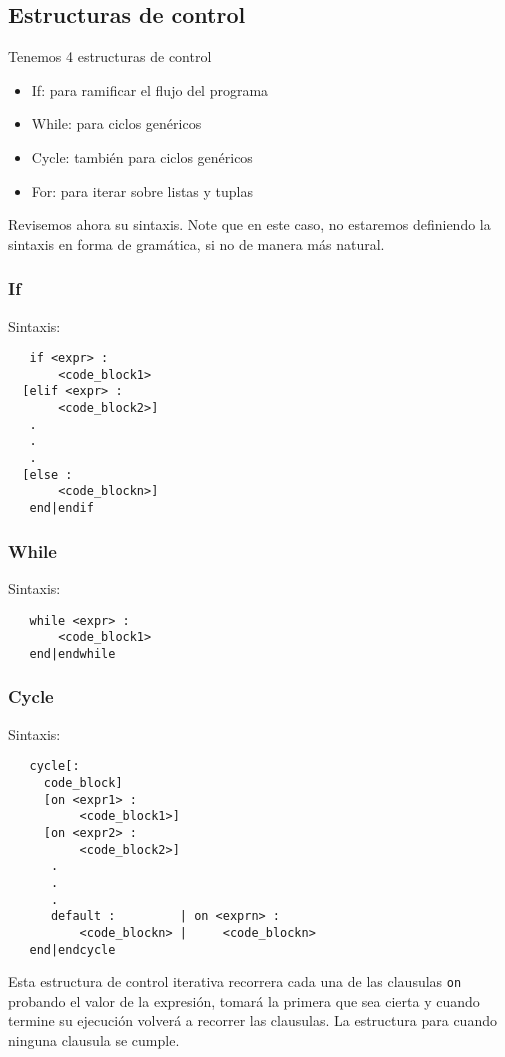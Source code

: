 \documentclass[12pt, spanish]{report}
\begin{document}
\subsection{Estructuras de control}
\label{sec:ecntrl}
Tenemos 4 estructuras de control
\begin{itemize}
\item If: para ramificar el flujo del programa
\item While: para ciclos gen\'ericos
\item Cycle: tambi\'en para ciclos gen\'ericos
\item For: para iterar sobre listas y tuplas
\end{itemize}

Revisemos ahora su sintaxis. Note que en este caso, no estaremos
definiendo la sintaxis en forma de gram\'atica, si no de manera m\'as natural.

\subsubsection{If}
Sintaxis:
\begin{verbatim}
   if <expr> :
       <code_block1>
  [elif <expr> :
       <code_block2>]
   .
   .
   .
  [else :
       <code_blockn>]
   end|endif
\end{verbatim}

\subsubsection{While}
Sintaxis:
\begin{verbatim}
   while <expr> :
       <code_block1>
   end|endwhile
\end{verbatim}

\subsubsection{Cycle}
Sintaxis:
\begin{verbatim}
   cycle[:
     code_block]
     [on <expr1> :
          <code_block1>]
     [on <expr2> :
          <code_block2>]
      .
      .
      .
      default :         | on <exprn> :
          <code_blockn> |     <code_blockn>
   end|endcycle
\end{verbatim}
Esta estructura de control iterativa recorrera cada una de las clausulas
\texttt{on} probando el valor de la expresi\'on, tomar\'a la primera que sea cierta
y cuando termine su ejecuci\'on volver\'a a recorrer las clausulas. La
estructura para cuando ninguna clausula se cumple.
\end{document}
